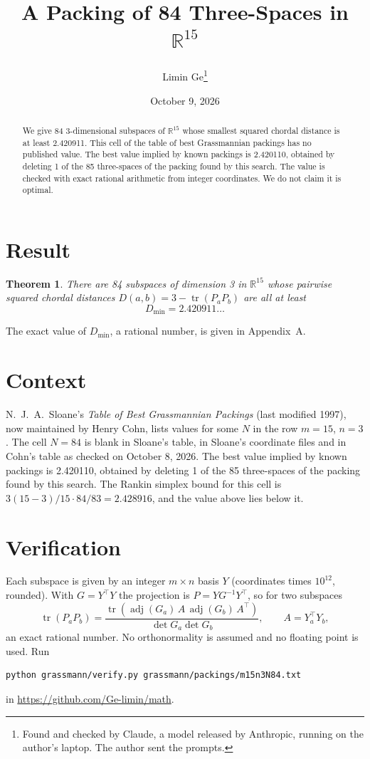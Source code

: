 \documentclass[11pt,a4paper]{article}
\title{A Packing of 84 Three-Spaces in $\mathbb{R}^{15}$}
\author{Limin Ge\thanks{Found and checked by Claude, a model released by Anthropic, running on the author's laptop. The author sent the prompts.}}
\date{October 9, 2026}
\newtheorem*{theorem}{Theorem}
\begin{document}
\maketitle
\begin{abstract}
We give 84 3-dimensional subspaces of $\mathbb{R}^{15}$ whose smallest squared chordal distance is at least 2.420911. This cell of the table of best Grassmannian packings has no published value. The best value implied by known packings is 2.420110, obtained by deleting 1 of the 85 three-spaces of the packing found by this search. The value is checked with exact rational arithmetic from integer coordinates. We do not claim it is optimal.
\end{abstract}

\section{Result}
\begin{theorem}
There are 84 subspaces of dimension 3 in $\mathbb{R}^{15}$ whose pairwise squared chordal distances $D(a,b) = 3 - \operatorname{tr}(P_aP_b)$ are all at least
\[ D_{\min} = 2.420911\ldots \]
\end{theorem}
The exact value of $D_{\min}$, a rational number, is given in Appendix~A.


\section{Context}
N.~J.~A.~Sloane's \emph{Table of Best Grassmannian Packings} (last modified 1997), now maintained by Henry Cohn, lists values for some $N$ in the row $m=15$, $n=3$. The cell $N=84$ is blank in Sloane's table, in Sloane's coordinate files and in Cohn's table as checked on October 8, 2026. The best value implied by known packings is 2.420110, obtained by deleting 1 of the 85 three-spaces of the packing found by this search. The Rankin simplex bound for this cell is $3(15-3)/15\cdot 84/83 = 2.428916$, and the value above lies below it.


\section{Verification}
Each subspace is given by an integer $m\times n$ basis $Y$ (coordinates times $10^{12}$, rounded). With $G=Y^\top Y$ the projection is $P=YG^{-1}Y^\top$, so for two subspaces
\[ \operatorname{tr}(P_aP_b)=\frac{\operatorname{tr}(\operatorname{adj}(G_a)\,A\,\operatorname{adj}(G_b)\,A^\top)}{\det G_a\det G_b},\qquad A=Y_a^\top Y_b, \]
an exact rational number. No orthonormality is assumed and no floating point is used. Run
\begin{verbatim}
python grassmann/verify.py grassmann/packings/m15n3N84.txt
\end{verbatim}
in \url{https://github.com/Ge-limin/math}.
\end{document}
